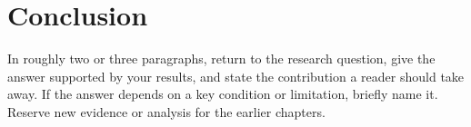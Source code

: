 \chapter{Conclusion}
\label{chap:conclusion}

In roughly two or three paragraphs, return to the research question, give the answer supported by your results, and state the contribution a reader should take away. If the answer depends on a key condition or limitation, briefly name it. Reserve new evidence or analysis for the earlier chapters.